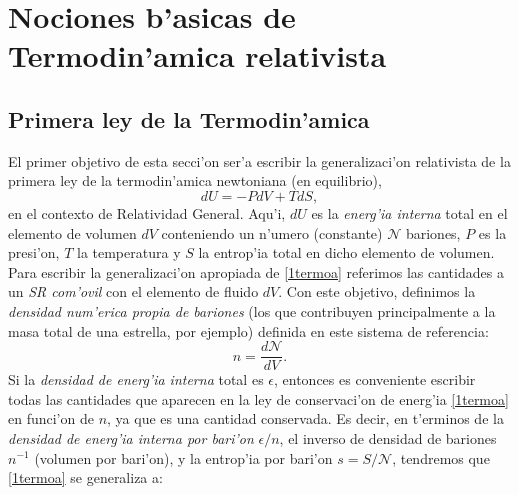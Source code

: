 \chapter[Nociones de Termodin'amica]{Nociones b'asicas de Termodin'amica relativista}\label{cap:termo}
\section{Primera ley de la Termodin'amica}
El primer objetivo de esta secci'on ser'a escribir la generalizaci'on relativista de la primera ley de la termodin'amica newtoniana (en equilibrio),
\begin{equation}\label{1termoa}
dU=-PdV+TdS,
\end{equation}
en el contexto de Relatividad General. Aqu'i, $dU$ es la \textit{energ'ia interna} total en el elemento de volumen $dV$ conteniendo un n'umero (constante) $\mathcal{N}$ bariones, $P$ es la presi'on, $T$ la temperatura y $S$ la entrop'ia total en dicho elemento de volumen. Para escribir la generalizaci'on apropiada de \eqref{1termoa} referimos las cantidades a un \textit{SR com'ovil} con el elemento de fluido $dV$. Con este objetivo, definimos la \textit{densidad num'erica propia de bariones} (los que contribuyen principalmente a la masa total de una estrella, por ejemplo) definida en este sistema de referencia:
\begin{equation}\label{densidadbarionica}
n=\frac{d\mathcal{N}}{dV}.
\end{equation}
Si la \textit{densidad de energ'ia interna} total es $\epsilon$, 
entonces es conveniente escribir todas las cantidades que aparecen en la ley de conservaci'on de energ'ia \eqref{1termoa} en funci'on de $n$, ya que es una cantidad conservada. Es decir, en  t'erminos de la \textit{densidad de energ'ia interna por bari'on} $\epsilon/n$, el inverso de densidad de bariones $n^{-1}$ (volumen por bari'on), y la entrop'ia por bari'on $s=S/\mathcal{N}$, tendremos que \eqref{1termoa} se generaliza a:

